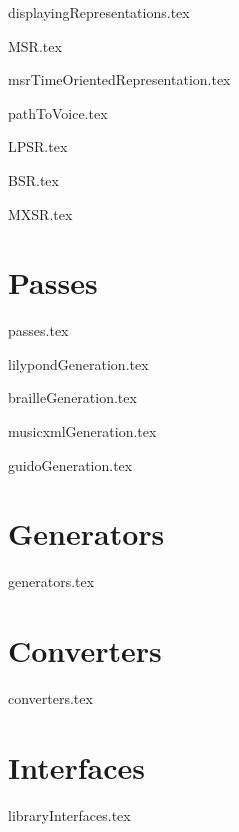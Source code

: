 \documentclass[11pt,a4paper]{report}
\begin{document}
{displayingRepresentations.tex}

{MSR.tex}

{msrTimeOrientedRepresentation.tex}

{pathToVoice.tex}

{LPSR.tex}

{BSR.tex}

{MXSR.tex}


\part{Passes}

{passes.tex}

{lilypondGeneration.tex}

{brailleGeneration.tex}

{musicxmlGeneration.tex}

{guidoGeneration.tex}


\part{Generators}

{generators.tex}


\part{Converters}

{converters.tex}


\part{Interfaces}

{libraryInterfaces.tex}
\end{document}
